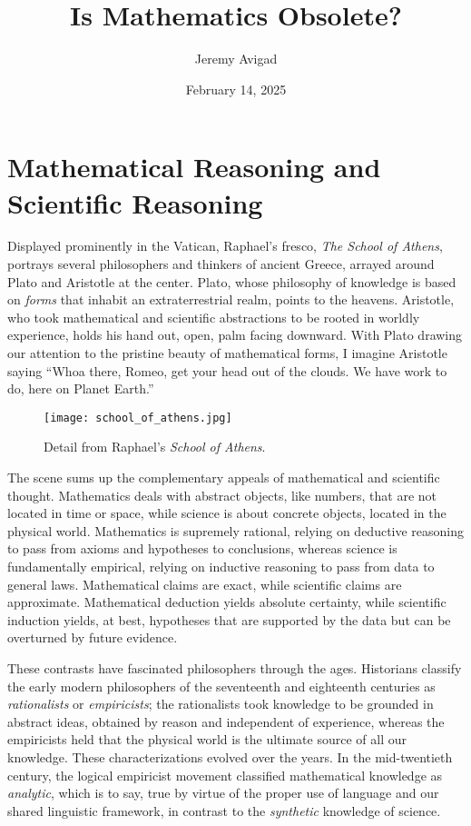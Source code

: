 \documentclass[11pt]{article}
\title{Is Mathematics Obsolete?}
\author{Jeremy Avigad}
\date{February 14, 2025}
\begin{document}
\maketitle

\section{Mathematical Reasoning and Scientific Reasoning}

Displayed prominently in the Vatican, Raphael's fresco, \emph{The School of Athens}, portrays several philosophers and thinkers of ancient Greece, arrayed around Plato and Aristotle at the center. Plato, whose philosophy of knowledge is based on \emph{forms} that inhabit an extraterrestrial realm, points to the heavens. Aristotle, who took mathematical and scientific abstractions to be rooted in worldly experience, holds his hand out, open, palm facing downward. With Plato drawing our attention to the pristine beauty of mathematical forms, I imagine Aristotle saying ``Whoa there, Romeo, get your head out of the clouds. We have work to do, here on Planet Earth.''

\begin{figure}[ht!]
  \centering
  \texttt{[image: school\_of\_athens.jpg]}
  \caption{Detail from Raphael's \emph{School of Athens}.}
\end{figure}

The scene sums up the complementary appeals of mathematical and scientific thought. Mathematics deals with abstract objects, like numbers, that are not located in time or space, while science is about concrete objects, located in the physical world. Mathematics is supremely rational, relying on deductive reasoning to pass from axioms and hypotheses to conclusions, whereas science is fundamentally empirical, relying on inductive reasoning to pass from data to general laws. Mathematical claims are exact, while scientific claims are approximate. Mathematical deduction yields absolute certainty, while scientific induction yields, at best, hypotheses that are supported by the data but can be overturned by future evidence.

These contrasts have fascinated philosophers through the ages. Historians classify the early modern philosophers of the seventeenth and eighteenth centuries as \emph{rationalists} or \emph{empiricists}; the rationalists took knowledge to be grounded in abstract ideas, obtained by reason and independent of experience, whereas the empiricists held that the physical world is the ultimate source of all our knowledge. These characterizations evolved over the years. In the mid-twentieth century, the logical empiricist movement classified mathematical knowledge as \emph{analytic}, which is to say, true by virtue of the proper use of language and our shared linguistic framework, in contrast to the \emph{synthetic} knowledge of science.
\end{document}
